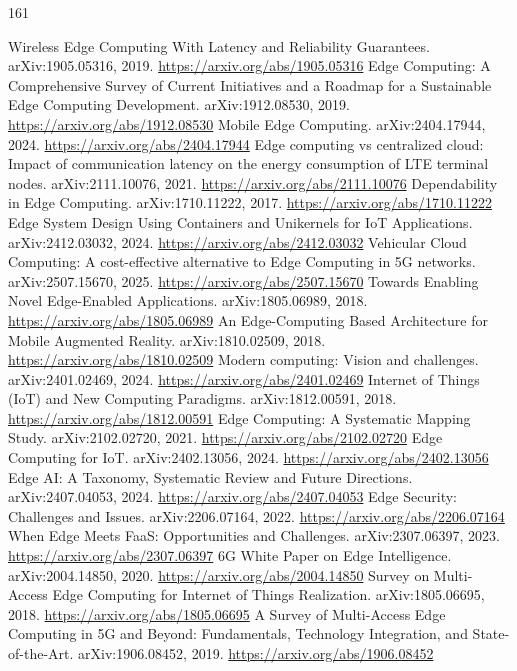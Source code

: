 \documentclass[11pt]{article}
\begin{document}
\begin{thebibliography}{161}
 Wireless Edge Computing With Latency and Reliability Guarantees. arXiv:1905.05316, 2019. \url{https://arxiv.org/abs/1905.05316}
 Edge Computing: A Comprehensive Survey of Current Initiatives and a Roadmap for a Sustainable Edge Computing Development. arXiv:1912.08530, 2019. \url{https://arxiv.org/abs/1912.08530}
 Mobile Edge Computing. arXiv:2404.17944, 2024. \url{https://arxiv.org/abs/2404.17944}
 Edge computing vs centralized cloud: Impact of communication latency on the energy consumption of LTE terminal nodes. arXiv:2111.10076, 2021. \url{https://arxiv.org/abs/2111.10076}
 Dependability in Edge Computing. arXiv:1710.11222, 2017. \url{https://arxiv.org/abs/1710.11222}
 Edge System Design Using Containers and Unikernels for IoT Applications. arXiv:2412.03032, 2024. \url{https://arxiv.org/abs/2412.03032}
 Vehicular Cloud Computing: A cost-effective alternative to Edge Computing in 5G networks. arXiv:2507.15670, 2025. \url{https://arxiv.org/abs/2507.15670}
 Towards Enabling Novel Edge-Enabled Applications. arXiv:1805.06989, 2018. \url{https://arxiv.org/abs/1805.06989}
 An Edge-Computing Based Architecture for Mobile Augmented Reality. arXiv:1810.02509, 2018. \url{https://arxiv.org/abs/1810.02509}
 Modern computing: Vision and challenges. arXiv:2401.02469, 2024. \url{https://arxiv.org/abs/2401.02469}
 Internet of Things (IoT) and New Computing Paradigms. arXiv:1812.00591, 2018. \url{https://arxiv.org/abs/1812.00591}
 Edge Computing: A Systematic Mapping Study. arXiv:2102.02720, 2021. \url{https://arxiv.org/abs/2102.02720}
 Edge Computing for IoT. arXiv:2402.13056, 2024. \url{https://arxiv.org/abs/2402.13056}
 Edge AI: A Taxonomy, Systematic Review and Future Directions. arXiv:2407.04053, 2024. \url{https://arxiv.org/abs/2407.04053}
 Edge Security: Challenges and Issues. arXiv:2206.07164, 2022. \url{https://arxiv.org/abs/2206.07164}
 When Edge Meets FaaS: Opportunities and Challenges. arXiv:2307.06397, 2023. \url{https://arxiv.org/abs/2307.06397}
 6G White Paper on Edge Intelligence. arXiv:2004.14850, 2020. \url{https://arxiv.org/abs/2004.14850}
 Survey on Multi-Access Edge Computing for Internet of Things Realization. arXiv:1805.06695, 2018. \url{https://arxiv.org/abs/1805.06695}
 A Survey of Multi-Access Edge Computing in 5G and Beyond: Fundamentals, Technology Integration, and State-of-the-Art. arXiv:1906.08452, 2019. \url{https://arxiv.org/abs/1906.08452}

\end{thebibliography}
\end{document}

